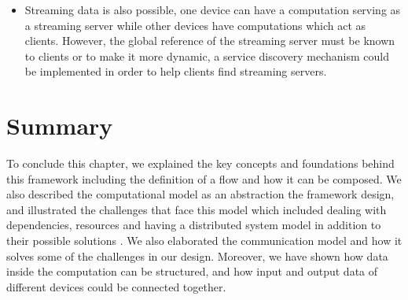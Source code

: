 \begin{itemize}
	\item Streaming data is also possible, one device can have a computation serving as a streaming server while other devices have computations which act as clients. However, the global reference of the streaming server must be known to clients or to make it more dynamic, a service discovery mechanism could be implemented in order to help clients find streaming servers.
\end{itemize}	


\section{Summary}

To conclude this chapter, we explained the key concepts and foundations behind this framework including the definition of a flow and how it can be composed. We also described the computational model as an abstraction the framework design, and illustrated the challenges that face this model which included  dealing with dependencies, resources and having a distributed system model in addition to their possible solutions . We also elaborated the communication model and how it solves some of the challenges in our design. Moreover, we have shown how data inside the computation can be structured, and how input and output data of different devices could be connected together.



